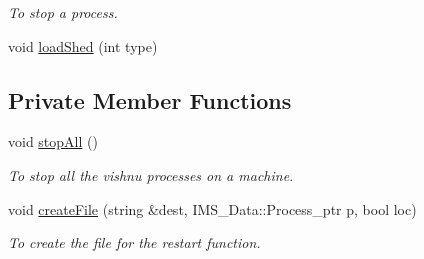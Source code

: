 \begin{DoxyCompactItemize}
\begin{DoxyCompactList}\small\item\em To stop a process. \item\end{DoxyCompactList}\item 
void \hyperlink{classProcessCtl_a573af8bdace41dc46472acadf7e222d7}{loadShed} (int type)
\end{DoxyCompactItemize}
\subsection*{Private Member Functions}
\begin{DoxyCompactItemize}
\item 
\hypertarget{classProcessCtl_af8eebb6eb14d7b02a452e27e9d146313}{
void \hyperlink{classProcessCtl_af8eebb6eb14d7b02a452e27e9d146313}{stopAll} ()}
\label{classProcessCtl_af8eebb6eb14d7b02a452e27e9d146313}

\begin{DoxyCompactList}\small\item\em To stop all the vishnu processes on a machine. \item\end{DoxyCompactList}\item 
void \hyperlink{classProcessCtl_a4a3c0f9f5ad25f02745b37abc7c33778}{createFile} (string \&dest, IMS\_\-Data::Process\_\-ptr p, bool loc)
\begin{DoxyCompactList}\small\item\em To create the file for the restart function. \item\end{DoxyCompactList}\end{DoxyCompactItemize}
